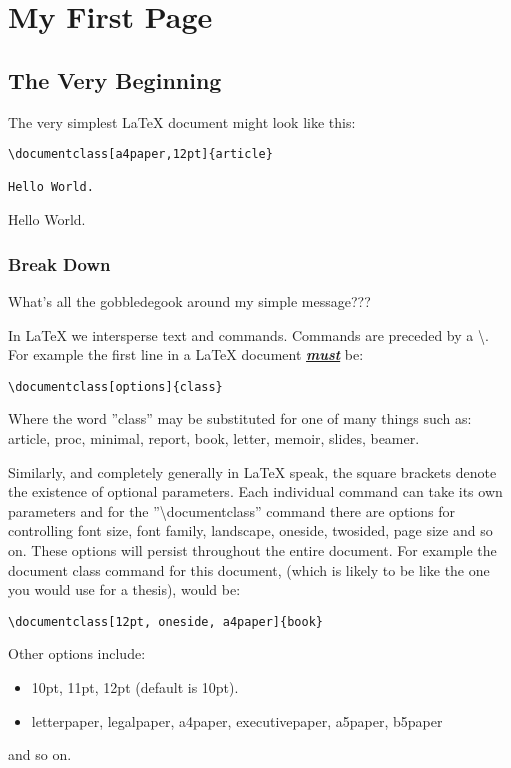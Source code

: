 \chapter{My First Page}

\section{The Very Beginning}
The very simplest LaTeX document might look like this:

\begin{verbatim}
\documentclass[a4paper,12pt]{article}

Hello World.

\end{verbatim}

\pagebreak
\thispagestyle{empty}
Hello World.
\pagebreak
\subsection{Break Down}
What's all the gobbledegook around my simple message???

In LaTeX we intersperse text and commands.  Commands are preceded by a \textbackslash. For example the first line in a LaTeX document \underline{\textbf{\emph{must}}} be:

\begin{verbatim}
\documentclass[options]{class}
\end{verbatim}

Where the word ''class'' may be substituted for one of many things such as: article, proc, minimal, report, book, letter, memoir, slides, beamer.

Similarly, and completely generally in LaTeX speak, the square brackets denote the existence of optional parameters. Each individual command can take its own parameters and for the ''{\textbackslash}documentclass'' command there are options for controlling font size, font family, landscape, oneside, twosided, page size and so on. These options will persist throughout the entire document. For example the document class command for this document, (which is likely to be like the one you would use for a thesis), would be:

\begin{verbatim}
\documentclass[12pt, oneside, a4paper]{book}
\end{verbatim}

Other options include:

\begin{itemize}
\item {10pt, 11pt, 12pt (default is 10pt).}
\item {letterpaper, legalpaper, a4paper, executivepaper, a5paper, b5paper}
\end{itemize}
and so on.

